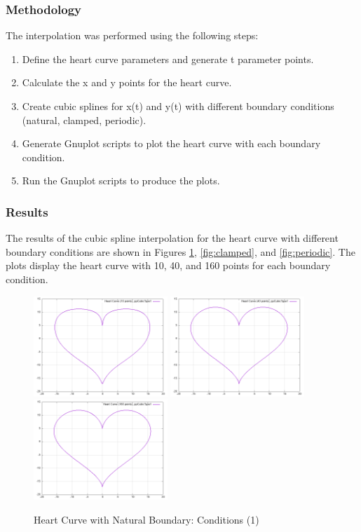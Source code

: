 \documentclass{article}
\begin{document}
\subsubsection{Methodology}
The interpolation was performed using the following steps:
\begin{enumerate}
    \item Define the heart curve parameters and generate t parameter points.
    \item Calculate the x and y points for the heart curve.
    \item Create cubic splines for x(t) and y(t) with different boundary conditions (natural, clamped, periodic).
    \item Generate Gnuplot scripts to plot the heart curve with each boundary condition.
    \item Run the Gnuplot scripts to produce the plots.
\end{enumerate}

\subsubsection{Results}
The results of the cubic spline interpolation for the heart curve with different boundary conditions are shown in Figures \ref{fig:natural}, \ref{fig:clamped}, and \ref{fig:periodic}. The plots display the heart curve with 10, 40, and 160 points for each boundary condition.

\begin{figure}[H]
    \centering
    \includegraphics[width=0.45\textwidth]{../figure/pp1spline_plot_10.png}
    \includegraphics[width=0.45\textwidth]{../figure/pp1spline_plot_40.png}
    \includegraphics[width=0.45\textwidth]{../figure/pp1spline_plot_160.png}
    \caption{Heart Curve with Natural Boundary: Conditions (1)}
    \label{fig:natural}
\end{figure}
\end{document}
